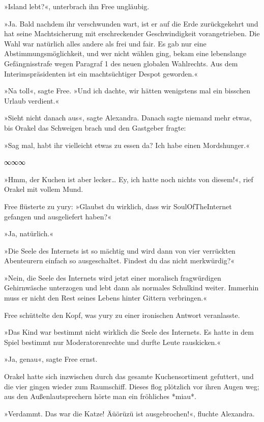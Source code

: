 »Island lebt?«, unterbrach ihn Free ungläubig.

»Ja. Bald nachdem ihr verschwunden wart, ist er auf die Erde zurückgekehrt und hat seine Machtsicherung mit erschreckender Geschwindigkeit vorangetrieben. Die Wahl war natürlich alles andere als frei und fair. Es gab nur eine Abstimmungsmöglichkeit, und wer nicht wählen ging, bekam eine lebenslange Gefängnisstrafe wegen Paragraf 1 des neuen globalen Wahlrechts. Aus dem Interimspräsidenten ist ein machtsüchtiger Despot geworden.«

»Na toll«, sagte Free. »Und ich dachte, wir hätten wenigstens mal ein bisschen Urlaub verdient.«

»Sieht nicht danach aus«, sagte Alexandra. Danach sagte niemand mehr etwas, bis Orakel das Schweigen brach und den Gastgeber fragte:

»Sag mal, habt ihr vielleicht etwas zu essen da? Ich habe einen Mordshunger.«

\begin{center}
    ∞∞∞
\end{center}

»Hmm, der Kuchen ist aber lecker… Ey, ich hatte noch nichts von diesem!«, rief Orakel mit vollem Mund.

Free flüsterte zu yury: »Glaubst du wirklich, dass wir SoulOfTheInternet gefangen und ausgeliefert haben?«

»Ja, natürlich.«

»Die Seele des Internets ist so mächtig und wird dann von vier verrückten Abenteurern einfach so ausgeschaltet. Findest du das nicht merkwürdig?«

»Nein, die Seele des Internets wird jetzt einer moralisch fragwürdigen Gehirnwäsche unterzogen und lebt dann als normales Schulkind weiter. Immerhin muss er nicht den Rest seines Lebens hinter Gittern verbringen.«

Free schüttelte den Kopf, was yury zu einer ironischen Antwort veranlasste.

»Das Kind war bestimmt nicht wirklich die Seele des Internets. Es hatte in dem Spiel bestimmt nur Moderatorenrechte und durfte Leute rauskicken.«

»Ja, genau«, sagte Free ernst.

Orakel hatte sich inzwischen durch das gesamte Kuchensortiment gefuttert, und die vier gingen wieder zum Raumschiff. Dieses flog plötzlich vor ihren Augen weg; aus den Außenlautsprechern hörte man ein fröhliches *miau*.

»Verdammt. Das war die Katze! Äüörüzü ist ausgebrochen!«, fluchte Alexandra.


